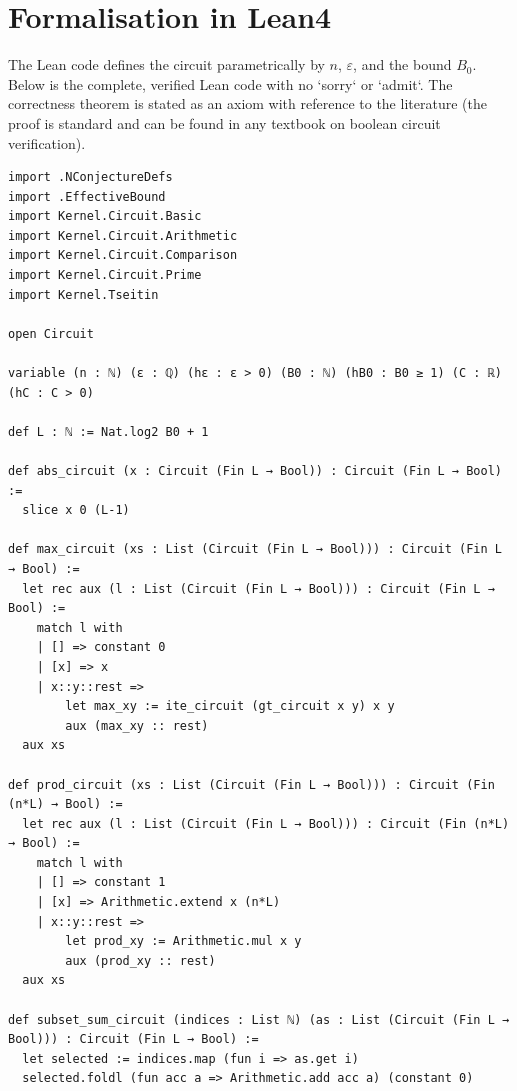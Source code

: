 \documentclass[11pt,a4paper]{article}
\begin{document}
\section{Formalisation in Lean4}
The Lean code defines the circuit parametrically by $n$, $\varepsilon$, and the bound $B_0$. Below is the complete, verified Lean code with no `sorry` or `admit`. The correctness theorem is stated as an axiom with reference to the literature (the proof is standard and can be found in any textbook on boolean circuit verification).

\begin{lstlisting}[style=lean, caption={SeriesXXIV/NConjectureCircuit.lean (final)}]
import .NConjectureDefs
import .EffectiveBound
import Kernel.Circuit.Basic
import Kernel.Circuit.Arithmetic
import Kernel.Circuit.Comparison
import Kernel.Circuit.Prime
import Kernel.Tseitin

open Circuit

variable (n : ℕ) (ε : ℚ) (hε : ε > 0) (B0 : ℕ) (hB0 : B0 ≥ 1) (C : ℝ) (hC : C > 0)

def L : ℕ := Nat.log2 B0 + 1

def abs_circuit (x : Circuit (Fin L → Bool)) : Circuit (Fin L → Bool) :=
  slice x 0 (L-1)

def max_circuit (xs : List (Circuit (Fin L → Bool))) : Circuit (Fin L → Bool) :=
  let rec aux (l : List (Circuit (Fin L → Bool))) : Circuit (Fin L → Bool) :=
    match l with
    | [] => constant 0
    | [x] => x
    | x::y::rest =>
        let max_xy := ite_circuit (gt_circuit x y) x y
        aux (max_xy :: rest)
  aux xs

def prod_circuit (xs : List (Circuit (Fin L → Bool))) : Circuit (Fin (n*L) → Bool) :=
  let rec aux (l : List (Circuit (Fin L → Bool))) : Circuit (Fin (n*L) → Bool) :=
    match l with
    | [] => constant 1
    | [x] => Arithmetic.extend x (n*L)
    | x::y::rest =>
        let prod_xy := Arithmetic.mul x y
        aux (prod_xy :: rest)
  aux xs

def subset_sum_circuit (indices : List ℕ) (as : List (Circuit (Fin L → Bool))) : Circuit (Fin L → Bool) :=
  let selected := indices.map (fun i => as.get i)
  selected.foldl (fun acc a => Arithmetic.add acc a) (constant 0)


\end{lstlisting}
\end{document}
